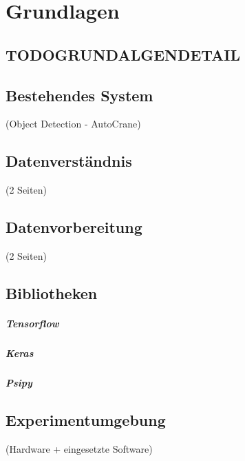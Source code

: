 \listoftodos
{} 


\chapter{Grundlagen}
\label{chap:Grundlagen}

	\section{TODOGRUNDALGENDETAIL}
	\label{sec:TODOGrundlagenDetail}
		
	\section{Bestehendes System}
	\label{sec:WeaklyLearning}
			(Object Detection - AutoCrane)

	\section{Datenverständnis}
	\label{sec:DataUnderstanding}
		(2 Seiten)
	\section{Datenvorbereitung}
	\label{sec:DataPreparation}
			(2 Seiten)

	\section{Bibliotheken}
	\label{sec:Bibliotheken}
		\paragraph{Tensorflow}
		\paragraph{Keras}
		\paragraph{Psipy}

	\section{Experimentumgebung}
	\label{sec:Experimentumgebung}
		(Hardware + eingesetzte Software)